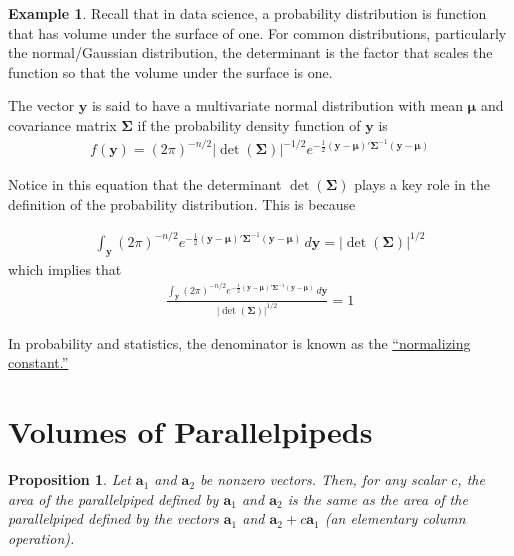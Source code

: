 \documentclass[
]{book}
\newtheorem{proposition}{Proposition}[chapter]
\theoremstyle{definition}
\theoremstyle{definition}
\newtheorem{example}{Example}[chapter]
\theoremstyle{definition}
\theoremstyle{definition}
\theoremstyle{remark}
\begin{document}
\begin{example}
Recall that in data science, a probability distribution is function that has volume under the surface of one. For common distributions, particularly the normal/Gaussian distribution, the determinant is the factor that scales the function so that the volume under the surface is one.

The vector \(\mathbf{y}\) is said to have a multivariate normal distribution with mean \(\boldsymbol{\mu}\) and covariance matrix \(\boldsymbol{\Sigma}\) if the probability density function of \(\mathbf{y}\) is
\[
\begin{aligned}
f(\mathbf{y}) = (2 \pi)^{-n/2} |\det(\boldsymbol{\Sigma})|^{-1/2} e^{- \frac{1}{2} (\mathbf{y} - \boldsymbol{\mu})' \boldsymbol{\Sigma}^{-1} (\mathbf{y} - \boldsymbol{\mu})}
\end{aligned}
\]

Notice in this equation that the determinant \(\det(\boldsymbol{\Sigma})\) plays a key role in the definition of the probability distribution. This is because

\[\begin{aligned}
\int_{\mathbf{y}} (2 \pi)^{-n/2} e^{- \frac{1}{2} (\mathbf{y} - \boldsymbol{\mu})' \boldsymbol{\Sigma}^{-1} (\mathbf{y} - \boldsymbol{\mu})} \, d\mathbf{y} = |\det(\boldsymbol{\Sigma})|^{1/2}
\end{aligned}
\]
which implies that
\[
\begin{aligned}
\frac{\int_{\mathbf{y}} (2 \pi)^{-n/2} e^{- \frac{1}{2} (\mathbf{y} - \boldsymbol{\mu})' \boldsymbol{\Sigma}^{-1} (\mathbf{y} - \boldsymbol{\mu})} \, d\mathbf{y}}{|\det(\boldsymbol{\Sigma})|^{1/2}} = 1
\end{aligned}
\]

In probability and statistics, the denominator is known as the \href{https://en.wikipedia.org/wiki/Normalizing_constant}{``normalizing constant.''}
\end{example}

\hypertarget{volumes-of-parallelpipeds}{%
\section{Volumes of Parallelpipeds}\label{volumes-of-parallelpipeds}}

\begin{proposition}
Let \(\mathbf{a}_1\) and \(\mathbf{a}_2\) be nonzero vectors. Then, for any scalar \(c\), the area of the parallelpiped defined by \(\mathbf{a}_1\) and \(\mathbf{a}_2\) is the same as the area of the parallelpiped defined by the vectors \(\mathbf{a}_1\) and \(\mathbf{a}_2 + c \mathbf{a}_1\) (an elementary column operation).
\end{proposition}
\end{document}
